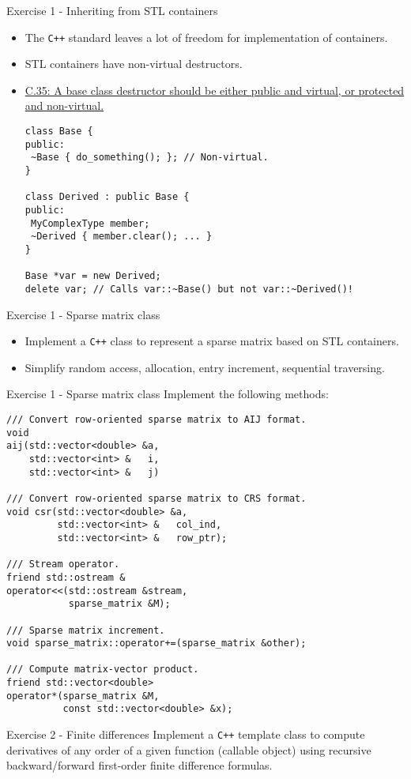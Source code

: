 \documentclass[10pt]{beamer}
\begin{document}
\begin{frame}[fragile]{Exercise 1 - Inheriting from STL containers}
\begin{itemize}
\item The \texttt{C++} standard leaves a lot of freedom for implementation of containers.
\item STL containers have non-virtual destructors.
\item \href{http://isocpp.github.io/CppCoreGuidelines/CppCoreGuidelines\#Rc-dtor-virtual}{C.35: A base class destructor should be either public and virtual, or protected and non-virtual.}
\small\begin{lstlisting}
class Base {
public:
 ~Base { do_something(); }; // Non-virtual.
}

class Derived : public Base {
public:
 MyComplexType member;
 ~Derived { member.clear(); ... }
}

Base *var = new Derived;
delete var; // Calls var::~Base() but not var::~Derived()!
\end{lstlisting}\normalsize
\end{itemize}
\end{frame}


\begin{frame}[fragile]{Exercise 1 - Sparse matrix class}
\begin{itemize}
\item Implement a \texttt{C++} class to represent a sparse matrix based on STL containers.
\item Simplify random access, allocation, entry increment, sequential traversing.
\end{itemize}
\end{frame}


\begin{frame}[fragile]{Exercise 1 - Sparse matrix class}
Implement the following methods:
\begin{lstlisting}[basicstyle=\footnotesize]
/// Convert row-oriented sparse matrix to AIJ format.
void
aij(std::vector<double> &a,
    std::vector<int> &   i,
    std::vector<int> &   j)

/// Convert row-oriented sparse matrix to CRS format.
void csr(std::vector<double> &a,
         std::vector<int> &   col_ind,
         std::vector<int> &   row_ptr);

/// Stream operator.
friend std::ostream &
operator<<(std::ostream &stream,
           sparse_matrix &M);

/// Sparse matrix increment.
void sparse_matrix::operator+=(sparse_matrix &other);

/// Compute matrix-vector product.
friend std::vector<double>
operator*(sparse_matrix &M,
          const std::vector<double> &x);
\end{lstlisting}
\end{frame}

\begin{frame}[fragile]{Exercise 2 - Finite differences}
Implement a \texttt{C++} template class to compute derivatives of any order of a given function (callable object) using recursive backward/forward first-order finite difference formulas.
\end{frame}
\end{document}
